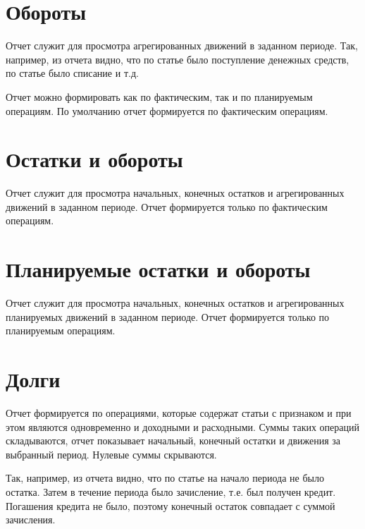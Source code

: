 \documentclass[a4paper,10pt,russian]{sphinxmanual}
\begin{document}
\section{Обороты}
\label{\detokenize{reports:id4}}
Отчет служит для просмотра агрегированных движений в заданном периоде. Так, например,
из отчета видно, что по статье  было поступление денежных средств, по статье 
было списание и т.д.

Отчет можно формировать как по фактическим, так и по планируемым операциям. По умолчанию отчет формируется
по фактическим операциям.


\section{Остатки и обороты}
\label{\detokenize{reports:id5}}
Отчет служит для просмотра начальных, конечных остатков и агрегированных движений в заданном периоде. Отчет формируется
только по фактическим операциям.

\noindent{}

\noindent{}

\noindent{}


\section{Планируемые остатки и обороты}
\label{\detokenize{reports:id6}}
Отчет служит для просмотра начальных, конечных остатков и агрегированных планируемых движений в заданном периоде. Отчет формируется
только по планируемым операциям.


\section{Долги}
\label{\detokenize{reports:id7}}
Отчет формируется по операциями, которые содержат статьи с признаком  и при этом являются
одновременно и доходными и расходными. Суммы таких операций складываются, отчет показывает начальный, конечный
остатки и движения за выбранный период. Нулевые суммы скрываются.

Так, например, из отчета видно, что по статье  на начало периода не было остатка. Затем
в течение периода было зачисление, т.е. был получен кредит. Погашения кредита не было, поэтому конечный
остаток совпадает с суммой зачисления.
\end{document}
